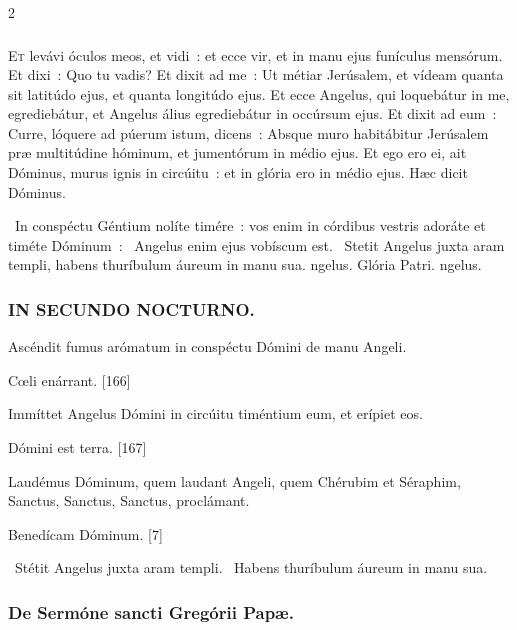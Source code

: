 \documentclass[9pt,twoside]{extarticle}
\begin{document}
\begin{multicols}{2}
{\subsubsection*{\center {}}
\lettrine{E}t levávi óculos meos, et vidi~: et ecce vir, et in manu ejus funículus mensórum.
Et dixi~: Quo tu vadis? Et dixit ad me~: Ut métiar Jerúsalem, et vídeam quanta sit latitúdo ejus, et quanta longitúdo ejus.
Et ecce Angelus, qui loquebátur in me, egrediebátur, et Angelus álius egrediebátur in occúrsum ejus.
Et dixit ad eum~: Curre, lóquere ad púerum istum, dicens~: Absque muro habitábitur Jerúsalem præ multitúdine hóminum, et jumentórum in médio ejus.
Et ego ero ei, ait Dóminus, murus ignis in circúitu~: et in glória ero in médio ejus. Hæc dicit Dóminus.

\begin{tightlist}{}
\item {}~In conspéctu Géntium nolíte timére~: vos enim in córdibus vestris adoráte et timéte Dóminum~: \textred{*}~Angelus enim ejus vobíscum est. ~Stetit Angelus juxta aram templi, habens thuríbulum áureum in manu sua. ngelus. Glória Patri. ngelus.
\end{tightlist}

\subsubsection*{\center \textsc{IN SECUNDO NOCTURNO.}}
\begin{tightlist}{}
\item {} Ascéndit fumus arómatum in conspéctu Dómini de manu Angeli.
\item {} Cœli enárrant. [166]
\item {} Immíttet Angelus Dómini in circúitu timéntium eum, et erípiet eos.
\item {} Dómini est terra. [167]
\item {} Laudémus Dóminum, quem laudant Angeli, quem Chérubim et Séraphim, Sanctus, Sanctus, Sanctus, proclámant.
\item {} Benedícam Dóminum. [7]
\item {}~Stétit Angelus juxta aram templi. ~Habens thuríbulum áureum in manu sua.
\end{tightlist}

\subsubsection*{\center De Sermóne sancti Gregórii Papæ.}
}
\end{multicols}
\end{document}
